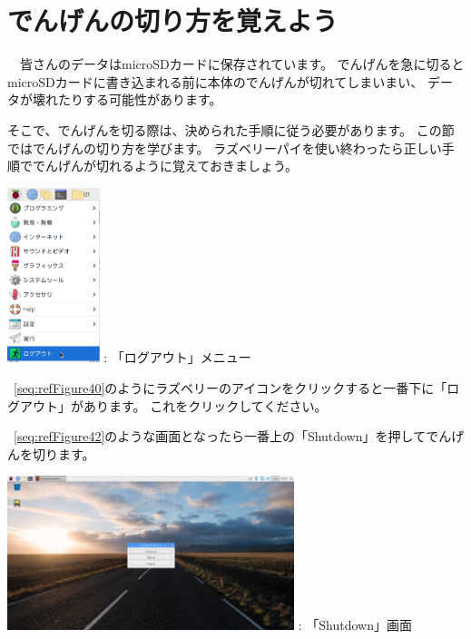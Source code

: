\documentclass[a4paper,12pt]{jarticle}
\begin{document}
\section{でんげんの切り方を覚えよう}
\ \ 皆さんのデータはmicroSDカードに保存されています。
でんげんを急に切るとmicroSDカードに書き込まれる前に本体のでんげんが切れてしまいまい、
データが壊れたりする可能性があります。

そこで、でんげんを切る際は、決められた手順に従う必要があります。
この節ではでんげんの切り方を学びます。
ラズベリーパイを使い終わったら正しい手順ででんげんが切れるように覚えておきましょう。



\centering
\begin{minipage}{8.115cm}
  {\upshape
    \centering
    \includegraphics[height=5.1cm]{textbook-img206.png}
    \newline
    {\theFigure\label{seq:refFigure40}}: 「ログアウト」メニュー}
\end{minipage}
\begin{minipage}{7.115cm}
  ~\ref{seq:refFigure40}のようにラズベリーのアイコンをクリックすると一番下に「ログアウト」があります。
  これをクリックしてください。
\end{minipage}
\bigskip


\flushleft
\textcolor[rgb]{0.13333334,0.13333334,0.13333334}{~\ref{seq:refFigure42}のような画面となったら一番上の「Shutdown」を押してでんげんを切ります。}
\bigskip
\centering
\begin{minipage}{8.225cm}
  {\upshape
    \includegraphics[height=4.5cm]{textbook-img208.jpg}
    {\theFigure\label{seq:refFigure42}}: 「Shutdown」画面}
\end{minipage}
\end{document}
